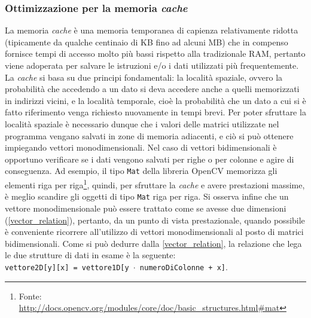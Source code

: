 \documentclass[12pt,a4paper,oneside]{article}
\begin{document}
\subsubsection{Ottimizzazione per la memoria \textit{cache}}
La memoria \textit{cache} è una memoria temporanea di capienza relativamente ridotta (tipicamente da qualche centinaio di KB fino ad alcuni MB) che in compenso fornisce tempi di accesso molto più bassi rispetto alla tradizionale \mbox{RAM}, pertanto viene adoperata per salvare le istruzioni e/o i dati utilizzati più frequentemente. La \textit{cache} si basa su due principi fondamentali: la località spaziale, ovvero la probabilità che accedendo a un dato si deva accedere anche a quelli memorizzati in indirizzi vicini, e la località temporale, cioè la probabilità che un dato a cui si è fatto riferimento venga richiesto nuovamente in tempi brevi. Per poter sfruttare la località spaziale è necessario dunque che i valori delle matrici utilizzate nel programma vengano salvati in zone di memoria adiacenti, e ciò si può ottenere impiegando vettori monodimensionali. Nel caso di vettori bidimensionali è opportuno verificare se i dati vengono salvati per righe o per colonne e agire di conseguenza. Ad esempio, il tipo \texttt{Mat} della libreria \gls{OpenCV} memorizza gli elementi riga per riga\footnote{Fonte: \url{http://docs.opencv.org/modules/core/doc/basic_structures.html\#mat}}, quindi, per sfruttare la \textit{cache} e avere prestazioni massime, è meglio scandire gli oggetti di tipo \texttt{Mat} riga per riga. Si osserva infine che un vettore monodimensionale può essere trattato come se avesse due dimensioni (\cref{vector_relation}), pertanto, da un punto di vista prestazionale, quando possibile è conveniente ricorrere all'utilizzo di vettori monodimensionali al posto di matrici bidimensionali. Come si può dedurre dalla \cref{vector_relation}, la relazione che lega le due strutture di dati in esame è la seguente:
\\\texttt{vettore2D[y][x] = vettore1D[y $\cdot$ numeroDiColonne + x]}.
\end{document}
